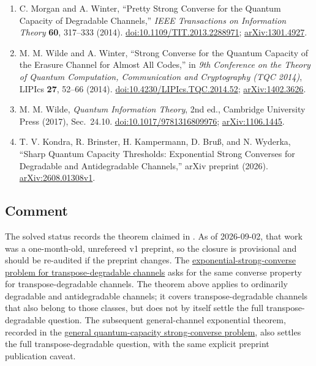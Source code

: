 \begin{enumerate}[label={},leftmargin=4.8em,labelsep=0.5em]
  \footnotesize
  \item[\textup{[MW14]}]\label{ref:p77-morgan-winter}
  C. Morgan and A. Winter,
  ``Pretty Strong Converse for the Quantum Capacity of Degradable
  Channels,'' \emph{IEEE Transactions on Information Theory} \textbf{60},
  317--333 (2014).
  \href{https://doi.org/10.1109/TIT.2013.2288971}{doi:10.1109/TIT.2013.2288971};
  \href{https://arxiv.org/abs/1301.4927}{arXiv:1301.4927}.

  \item[\textup{[WW14]}]\label{ref:p77-wilde-winter}
  M. M. Wilde and A. Winter,
  ``Strong Converse for the Quantum Capacity of the Erasure Channel for
  Almost All Codes,'' in \emph{9th Conference on the Theory of Quantum
  Computation, Communication and Cryptography (TQC 2014)}, LIPIcs
  \textbf{27}, 52--66 (2014).
  \href{https://doi.org/10.4230/LIPIcs.TQC.2014.52}{doi:10.4230/LIPIcs.TQC.2014.52};
  \href{https://arxiv.org/abs/1402.3626}{arXiv:1402.3626}.

  \item[\textup{[Wil17]}]\label{ref:p77-wilde}
  M. M. Wilde, \emph{Quantum Information Theory}, 2nd ed., Cambridge
  University Press (2017), Sec.~24.10.
  \href{https://doi.org/10.1017/9781316809976}{doi:10.1017/9781316809976};
  \href{https://arxiv.org/abs/1106.1445}{arXiv:1106.1445}.

  \item[\textup{[KBK+26]}]\label{ref:p77-kondra-et-al}
  T. V. Kondra, R. Brinster, H. Kampermann, D. Bru{\ss}, and N. Wyderka,
  ``Sharp Quantum Capacity Thresholds: Exponential Strong Converses for
  Degradable and Antidegradable Channels,'' arXiv preprint (2026).
  \href{https://arxiv.org/abs/2608.01308v1}{arXiv:2608.01308v1}.
\end{enumerate}

\subsection*{Comment}

The solved status records the theorem claimed in
.  As of 2026-09-02, that work was
a one-month-old, unrefereed v1 preprint, so the closure is provisional and
should be re-audited if the preprint changes.
The
\href{https://qiqc-op.com/problem/op_414fbcc7d5dc0c64/}{exponential-strong-converse problem for transpose-degradable channels}
asks for the same converse property for transpose-degradable channels.
The theorem above applies to ordinarily degradable and antidegradable
channels; it covers transpose-degradable channels that also belong to those
classes, but does not by itself settle the full transpose-degradable question. The subsequent general-channel exponential theorem, recorded in the \href{https://qiqc-op.com/problem/op_38f9dbb6c3f92b0c/}{general quantum-capacity strong-converse problem}, also settles the full transpose-degradable question, with the same explicit preprint publication caveat.

